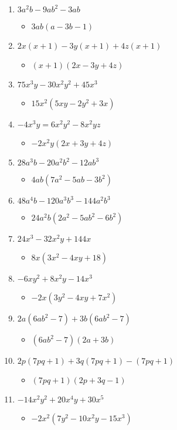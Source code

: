 \documentclass{article}
\begin{document}
\begin{enumerate}
\begin{itemize}
  \end{itemize}
\item $3a^{2}b - 9ab^{2} - 3ab$
  \begin{itemize}
  \item $3ab(a-3b-1)$
  \end{itemize}
\item $2x(x+1) - 3y(x+1) + 4z(x+1)$
  \begin{itemize}
  \item $(x+1)(2x-3y+4z)$
  \end{itemize}
\item $75x^{3}y - 30x^{2}y^{2} + 45x^{3}$
  \begin{itemize}
  \item $15x^{2}(5xy-2y^{2}+3x)$
  \end{itemize}
\item $-4x^{3}y = 6x^{2}y^{2} - 8x^{2}yz$
  \begin{itemize}
  \item $-2x^{2}y(2x+3y+4z)$
  \end{itemize}
\item $28a^{3}b - 20a^{2}b^{2} - 12ab^{3}$
  \begin{itemize}
  \item $4ab(7a^{2}-5ab-3b^{2})$
  \end{itemize}
\item $48a^{4}b - 120a^{3}b^{3} - 144a^{2}b^{3}$
  \begin{itemize}
  \item $24a^{2}b(2a^{2}-5ab^{2}-6b^{2})$
  \end{itemize}
\item $24x^{3} - 32x^{2}y + 144x$
  \begin{itemize}
  \item $8x(3x^{2}-4xy+18)$
  \end{itemize}
\item $-6xy^{2} + 8x^{2}y - 14x^{3}$
  \begin{itemize}
  \item $-2x(3y^{2}-4xy+7x^{2})$
  \end{itemize}
\item $2a(6ab^{2}-7) + 3b(6ab^{2}-7)$
  \begin{itemize}
  \item $(6ab^{2}-7)(2a+3b)$
  \end{itemize}
\item $2p(7pq+1) + 3q(7pq+1) - (7pq+1)$
  \begin{itemize}
  \item $(7pq+1)(2p+3q-1)$
  \end{itemize}
\item $-14x^{2}y^{2} + 20x^{4}y + 30x^{5}$
  \begin{itemize}
  \item $-2x^{2}(7y^{2}-10x^{2}y-15x^{3})$
  \end{itemize}
\end{enumerate}
\end{document}

